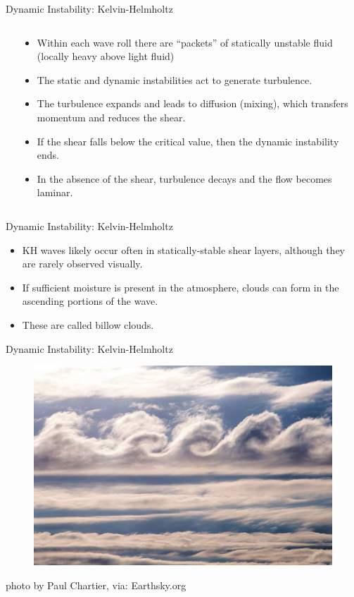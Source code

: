 \begin{frame}{Dynamic Instability: Kelvin-Helmholtz}
\begin{columns}[T]
\begin{column}{.3\textwidth}
\begin{minipage}[c][0.75\textheight][c]{\linewidth}
    	\end{minipage}
    \end{column}
    \begin{column}{.7\textwidth}
    	\begin{itemize}
    		\item Within each wave roll there are ``packets'' of statically unstable fluid (locally heavy above light fluid)
    		\item The static and dynamic instabilities act to generate turbulence.
    		\item The turbulence expands and leads to diffusion (mixing), which transfers momentum and reduces the shear.
    		\item If the shear falls below the critical value, then the dynamic instability ends.
    		\item In the absence of the shear, turbulence decays and the flow becomes laminar.
    	\end{itemize}
    \end{column}
  \end{columns}
\end{frame}
\begin{frame}{Dynamic Instability: Kelvin-Helmholtz}
\begin{itemize}
	\item KH waves likely occur often in statically-stable shear layers, although they are rarely observed visually.
	\item If sufficient moisture is present in the atmosphere, clouds can form in the ascending portions of the wave.
	\item These are called billow clouds.
\end{itemize}
\end{frame}
\begin{frame}{Dynamic Instability: Kelvin-Helmholtz}
\begin{figure}
	\includegraphics[width=\textwidth]{kh2}
\end{figure}
\small{photo by Paul Chartier, via: Earthsky.org}
\end{frame}
